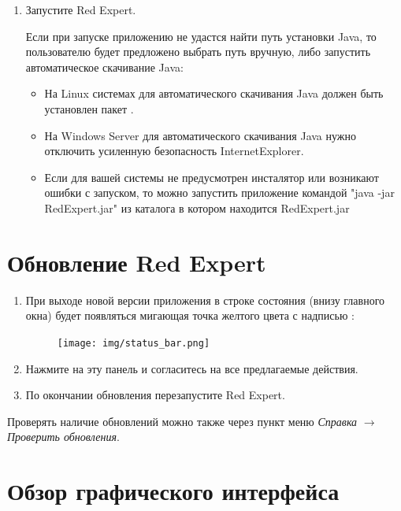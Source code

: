 \begin{enumerate}[leftmargin=15pt]
\item Запустите Red Expert.

\begin{redremark}
Если при запуске приложению не удастся найти путь установки Java, то пользователю будет предложено выбрать путь вручную, либо запустить автоматическое скачивание Java:
\begin{itemize}[leftmargin=15pt]
	\item На Linux системах для автоматического скачивания Java должен быть установлен пакет .
	\item На Windows Server для автоматического скачивания Java нужно отключить усиленную безопасность InternetExplorer.
	\item Если для вашей системы не предусмотрен инсталятор или возникают ошибки с запуском, то можно запустить приложение командой "java -jar RedExpert.jar" из каталога в котором находится RedExpert.jar
\end{itemize}
\end{redremark}
\end{enumerate}	

\newpage

\section{Обновление Red Expert}
\begin{enumerate}[leftmargin=25pt]
\item При выходе новой версии приложения в строке состояния (внизу главного окна)
будет появляться мигающая точка желтого цвета с надписью :
\begin{figure}[H]
	\begin{flushright}
		\texttt{[image: img/status\_bar.png]}
	\end{flushright}
\end{figure}

\item Нажмите на эту панель и согласитесь на все предлагаемые действия.

\item По окончании обновления перезапустите Red Expert.
\end{enumerate}	

Проверять наличие обновлений можно также через пункт меню \textit{Справка} $\rightarrow$ \textit{Проверить обновления}.

\newpage
\section{Обзор графического интерфейса}\label{sec:overview}


